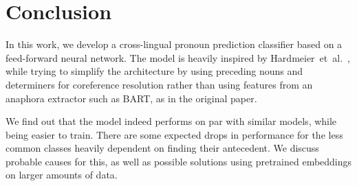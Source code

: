 \documentclass[11pt]{article}
\begin{document}
\section{Conclusion}

In this work, we develop a cross-lingual pronoun prediction classifier based on a feed-forward neural network.
The model is heavily inspired by Hardmeier~et~al.~, while trying to simplify the architecture by using preceding nouns and determiners for coreference resolution rather than using features from an anaphora extractor such as BART, as in the original paper.

We find out that the model indeed performs on par with similar models, while being easier to train.
There are some expected drops in performance for the less common classes heavily dependent on finding their antecedent.
We discuss probable causes for this, as well as possible solutions using pretrained embeddings on larger amounts of data.



\end{document}
